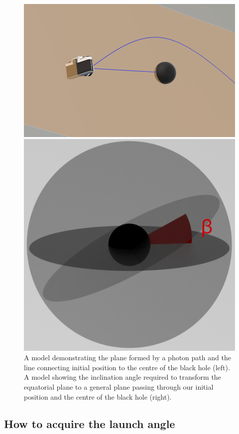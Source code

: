 \documentclass[oneside,openright,frontopenright, singlespacing]{dmathesis}
\begin{document}
\begin{figure}[!ht]
	\centering
	\begin{minipage}{0.5\textwidth}
		\centering
		\includegraphics[width=0.8\linewidth]{img/plane}
	\end{minipage}%
	\hfill
	\begin{minipage}{0.5\textwidth}
		\centering
		\includegraphics[width=0.72\linewidth]{img/inclinationfigure}
	\end{minipage}
	\caption{A model demonstrating the plane formed by a photon path and the line connecting initial position to the centre of the black hole (left). A model showing the inclination angle required to transform the equatorial plane to a general plane passing through our initial position and the centre of the black hole (right).}
	\label{fig:Figure3.2}
\end{figure}

\subsection{How to acquire the launch angle}\label{subsec:Subsection3.5.2}
\end{document}

